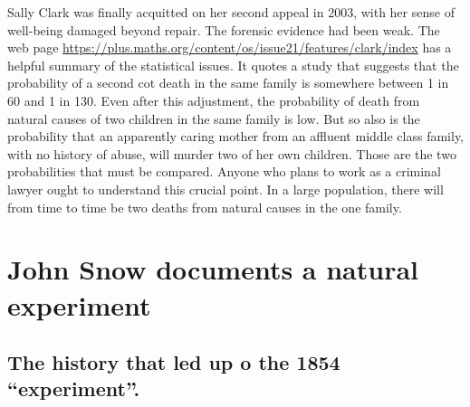 \documentclass[
  10pt,
  b5paper]{book}
\begin{document}
Sally Clark was finally acquitted on her second appeal in
2003, with her sense of well-being damaged beyond repair.
The forensic evidence had been weak. The web page
\url{https://plus.maths.org/content/os/issue21/features/clark/index}
has a helpful summary of the statistical issues. It
quotes a study that suggests that the probability of a
second cot death in the same family is somewhere between 1
in 60 and 1 in 130. Even after this adjustment, the
probability of death from natural causes of two children in
the same family is low. But so also is the probability that
an apparently caring mother from an affluent middle class
family, with no history of abuse, will murder two of her own
children. Those are the two probabilities that must be
compared. Anyone who plans to work as a criminal lawyer
ought to understand this crucial point. In a
large population, there will from time to time be two deaths
from natural causes in the one family.

\hypertarget{john-snow-documents-a-natural-experiment}{%
\section{John Snow documents a natural experiment}\label{john-snow-documents-a-natural-experiment}}

\hypertarget{the-history-that-led-up-o-the-1854-experiment.}{%
\subsection*{The history that led up o the 1854 ``experiment''.}\label{the-history-that-led-up-o-the-1854-experiment.}}
\end{document}
